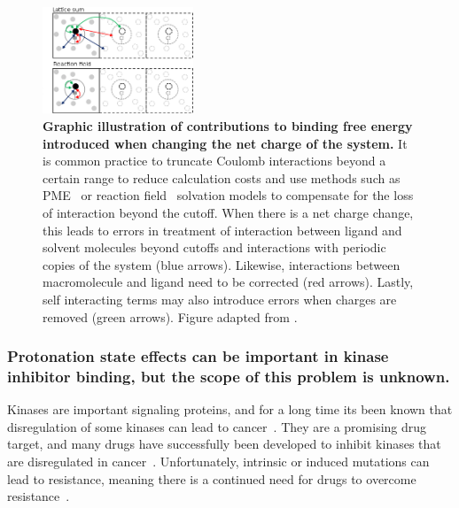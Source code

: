 \documentclass[10pt,final]{article}
\begin{document}
\begin{figure}[H]
  \centering
  \includegraphics[width=0.4\textwidth]{figures/reif_oostenbrink.png}
    \caption{\textbf{Graphic illustration of contributions to binding free energy introduced when changing the net charge of the system.}  It is common practice to truncate Coulomb interactions beyond a certain range to reduce calculation costs and use methods such as PME~\autocite{Essmann1995a} or reaction field~\autocite{Tironi1995a} solvation models to compensate for the loss of interaction beyond the cutoff. When there is a net charge change, this leads to errors in treatment of interaction between ligand and solvent molecules beyond cutoffs and interactions with periodic copies of the system (blue arrows). Likewise, interactions between macromolecule and ligand need to be corrected (red arrows). Lastly, self interacting terms may also introduce errors when charges are removed (green arrows). Figure adapted from \textcite{Reif2013a}.}
  \label{figure:chargecorrections}
\end{figure}

\subsubsection*{Protonation state effects can be important in kinase inhibitor binding, but the scope of this problem is unknown.}
Kinases are important signaling proteins, and for a long time its been known that disregulation of some kinases can lead to cancer~\autocite{Levinson1978a,Vivanco2002a}.
%
They are a promising drug target, and many drugs have successfully been developed to inhibit kinases that are disregulated in cancer~\autocite{Baselga2006a,Garber2006a,OHare2011a}.
%
Unfortunately, intrinsic or induced mutations can lead to resistance, meaning there is a continued need for drugs to overcome resistance~\autocite{Shah2004a,Pao2005a,Garber2006a,Zhang2009a}.
\end{document}
